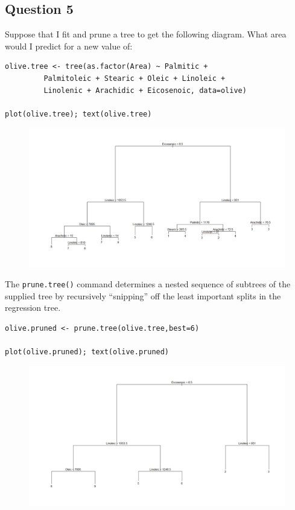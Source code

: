 \documentclass[caret-main.tex]{subfiles}
\begin{document}
\subsection*{Question 5}
Suppose that I fit and prune a tree to get the following diagram. What area
would I predict for a new value of:
\begin{framed}
\begin{verbatim}
olive.tree <- tree(as.factor(Area) ~ Palmitic + 
         Palmitoleic + Stearic + Oleic + Linoleic + 
         Linolenic + Arachidic + Eicosenoic, data=olive)

plot(olive.tree); text(olive.tree)
\end{verbatim}
\end{framed}
\begin{figure}[h!]
\centering
\includegraphics[width=1.19\linewidth]{./DAquiz6q5a}
\caption{}
\label{fig:DAquiz6q5a}
\end{figure}
The \texttt{prune.tree()} command determines a nested sequence of subtrees of the supplied tree by recursively “snipping” off the least important splits in the regression tree.
\begin{framed}
\begin{verbatim}
olive.pruned <- prune.tree(olive.tree,best=6)

plot(olive.pruned); text(olive.pruned)
\end{verbatim}
\end{framed}
\begin{figure}[h!]
\centering
\includegraphics[width=1.19\linewidth]{./DAquiz6q5b}
\caption{}
\label{fig:DAquiz6q5b}
\end{figure}
\end{document}
